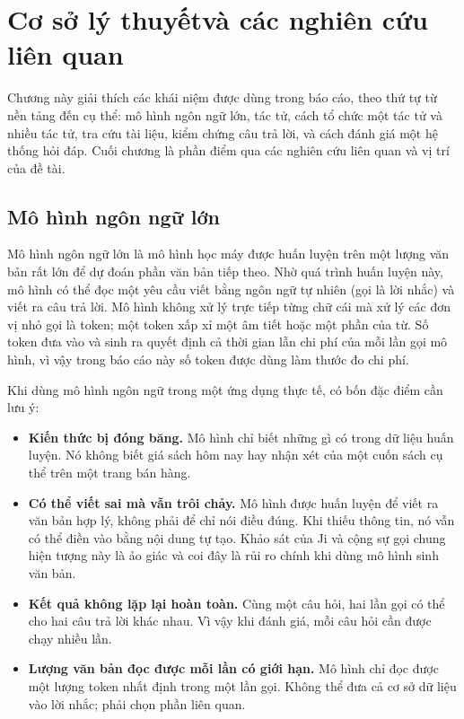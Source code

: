 \chapter[Cơ sở lý thuyết và các nghiên cứu liên quan]{Cơ sở lý thuyết\protect\newline và các nghiên cứu liên quan}
\label{ch:co-so}

Chương này giải thích các khái niệm được dùng trong báo cáo, theo thứ tự từ nền tảng đến cụ thể: mô hình ngôn ngữ lớn, tác tử, cách tổ chức một tác tử và nhiều tác tử, tra cứu tài liệu, kiểm chứng câu trả lời, và cách đánh giá một hệ thống hỏi đáp. Cuối chương là phần điểm qua các nghiên cứu liên quan và vị trí của đề tài.

\section{Mô hình ngôn ngữ lớn}

Mô hình ngôn ngữ lớn là mô hình học máy được huấn luyện trên một lượng văn bản rất lớn để dự đoán phần văn bản tiếp theo. Nhờ quá trình huấn luyện này, mô hình có thể đọc một yêu cầu viết bằng ngôn ngữ tự nhiên (gọi là lời nhắc) và viết ra câu trả lời. Mô hình không xử lý trực tiếp từng chữ cái mà xử lý các đơn vị nhỏ gọi là token; một token xấp xỉ một âm tiết hoặc một phần của từ. Số token đưa vào và sinh ra quyết định cả thời gian lẫn chi phí của mỗi lần gọi mô hình, vì vậy trong báo cáo này số token được dùng làm thước đo chi phí.

Khi dùng mô hình ngôn ngữ trong một ứng dụng thực tế, có bốn đặc điểm cần lưu ý:

\begin{itemize}
    \item \textbf{Kiến thức bị đóng băng.} Mô hình chỉ biết những gì có trong dữ liệu huấn luyện. Nó không biết giá sách hôm nay hay nhận xét của một cuốn sách cụ thể trên một trang bán hàng.
    \item \textbf{Có thể viết sai mà vẫn trôi chảy.} Mô hình được huấn luyện để viết ra văn bản hợp lý, không phải để chỉ nói điều đúng. Khi thiếu thông tin, nó vẫn có thể điền vào bằng nội dung tự tạo. Khảo sát của Ji và cộng sự  gọi chung hiện tượng này là ảo giác và coi đây là rủi ro chính khi dùng mô hình sinh văn bản.
    \item \textbf{Kết quả không lặp lại hoàn toàn.} Cùng một câu hỏi, hai lần gọi có thể cho hai câu trả lời khác nhau. Vì vậy khi đánh giá, mỗi câu hỏi cần được chạy nhiều lần.
    \item \textbf{Lượng văn bản đọc được mỗi lần có giới hạn.} Mô hình chỉ đọc được một lượng token nhất định trong một lần gọi. Không thể đưa cả cơ sở dữ liệu vào lời nhắc; phải chọn phần liên quan.
\end{itemize}

